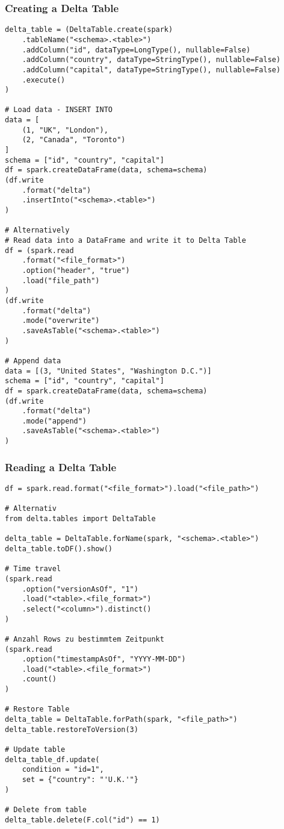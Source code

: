 \documentclass[11pt]{scrartcl}
\begin{document}
\subsubsection{Creating a Delta Table} 
\begin{lstlisting}
delta_table = (DeltaTable.create(spark)
	.tableName("<schema>.<table>")
	.addColumn("id", dataType=LongType(), nullable=False)
	.addColumn("country", dataType=StringType(), nullable=False)
	.addColumn("capital", dataType=StringType(), nullable=False)
	.execute()
)

# Load data - INSERT INTO
data = [
	(1, "UK", "London"),
	(2, "Canada", "Toronto")
]
schema = ["id", "country", "capital"]
df = spark.createDataFrame(data, schema=schema)
(df.write
	.format("delta")
	.insertInto("<schema>.<table>")
)

# Alternatively
# Read data into a DataFrame and write it to Delta Table
df = (spark.read
	.format("<file_format>")
	.option("header", "true")
	.load("file_path")
)
(df.write
	.format("delta")
	.mode("overwrite")
	.saveAsTable("<schema>.<table>")
)

# Append data
data = [(3, "United States", "Washington D.C.")]
schema = ["id", "country", "capital"]
df = spark.createDataFrame(data, schema=schema)
(df.write
	.format("delta")
	.mode("append")
	.saveAsTable("<schema>.<table>")
)
\end{lstlisting}


\subsubsection{Reading a Delta Table}
\begin{lstlisting}
df = spark.read.format("<file_format>").load("<file_path>")

# Alternativ
from delta.tables import DeltaTable

delta_table = DeltaTable.forName(spark, "<schema>.<table>")
delta_table.toDF().show()

# Time travel
(spark.read
	.option("versionAsOf", "1")
	.load("<table>.<file_format>")
	.select("<column>").distinct()
) 

# Anzahl Rows zu bestimmtem Zeitpunkt
(spark.read
	.option("timestampAsOf", "YYYY-MM-DD")
	.load("<table>.<file_format>")
	.count()
)

# Restore Table
delta_table = DeltaTable.forPath(spark, "<file_path>") 
delta_table.restoreToVersion(3)

# Update table
delta_table_df.update(
	condition = "id=1",
	set = {"country": "'U.K.'"}
)

# Delete from table
delta_table.delete(F.col("id") == 1)
\end{lstlisting}
\end{document}
